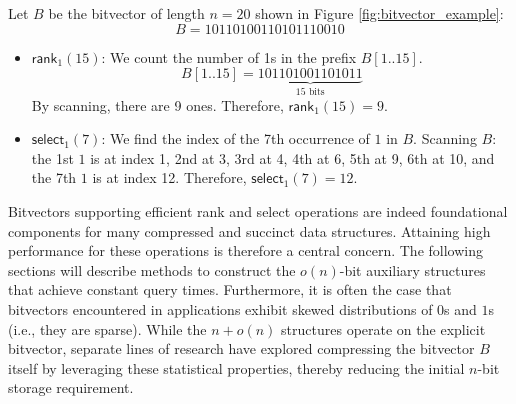 \begin{example}
    Let $B$ be the bitvector of length $n=20$ shown in Figure \ref{fig:bitvector_example}:
    \begin{equation*}
        B = 10110100110101110010
    \end{equation*}
    \begin{itemize}
        \item $\textsf{rank}_1(15)$: We count the number of 1s in the prefix $B[1..15]$.
              \begin{equation*}
                  B[1..15] = \underbrace{101101001101011}_{15 \text{ bits}}
              \end{equation*}
              By scanning, there are 9 ones. Therefore, $\textsf{rank}_1(15) = 9$.

        \item $\textsf{select}_1(7)$: We find the index of the 7th occurrence of $1$ in $B$.
              Scanning $B$: the 1st $1$ is at index 1, 2nd at 3, 3rd at 4, 4th at 6, 5th at 9, 6th at 10, and the 7th $1$ is at index 12.
              Therefore, $\textsf{select}_1(7) = 12$.
    \end{itemize}
\end{example}

Bitvectors supporting efficient \textsf{rank} and \textsf{select} operations are indeed foundational components for many compressed and succinct data structures. Attaining high performance for these operations is therefore a central concern. The following sections will describe methods to construct the $o(n)$-bit auxiliary structures that achieve constant query times. Furthermore, it is often the case that bitvectors encountered in applications exhibit skewed distributions of $0$s and $1$s (i.e., they are sparse). While the $n+o(n)$ structures operate on the explicit bitvector, separate lines of research have explored compressing the bitvector $B$ itself by leveraging these statistical properties, thereby reducing the initial $n$-bit storage requirement.


